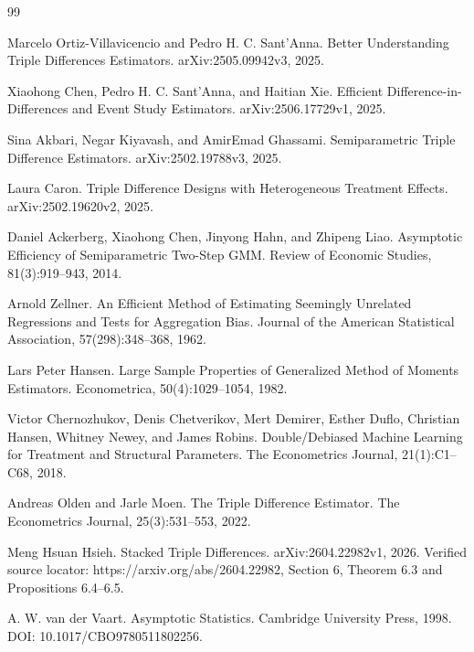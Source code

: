 \documentclass{article}
\begin{document}
\begin{thebibliography}{99}

   Marcelo Ortiz-Villavicencio and Pedro H. C. Sant'Anna. Better Understanding Triple Differences Estimators. arXiv:2505.09942v3, 2025.

   Xiaohong Chen, Pedro H. C. Sant'Anna, and Haitian Xie. Efficient Difference-in-Differences and Event Study Estimators. arXiv:2506.17729v1, 2025.

   Sina Akbari, Negar Kiyavash, and AmirEmad Ghassami. Semiparametric Triple Difference Estimators. arXiv:2502.19788v3, 2025.

   Laura Caron. Triple Difference Designs with Heterogeneous Treatment Effects. arXiv:2502.19620v2, 2025.

   Daniel Ackerberg, Xiaohong Chen, Jinyong Hahn, and Zhipeng Liao. Asymptotic Efficiency of Semiparametric Two-Step GMM. Review of Economic Studies, 81(3):919--943, 2014.

   Arnold Zellner. An Efficient Method of Estimating Seemingly Unrelated Regressions and Tests for Aggregation Bias. Journal of the American Statistical Association, 57(298):348--368, 1962.

   Lars Peter Hansen. Large Sample Properties of Generalized Method of Moments Estimators. Econometrica, 50(4):1029--1054, 1982.

   Victor Chernozhukov, Denis Chetverikov, Mert Demirer, Esther Duflo, Christian Hansen, Whitney Newey, and James Robins. Double/Debiased Machine Learning for Treatment and Structural Parameters. The Econometrics Journal, 21(1):C1--C68, 2018.

   Andreas Olden and Jarle Moen. The Triple Difference Estimator. The Econometrics Journal, 25(3):531--553, 2022.

   Meng Hsuan Hsieh. Stacked Triple Differences. arXiv:2604.22982v1, 2026. Verified source locator: https://arxiv.org/abs/2604.22982, Section 6, Theorem 6.3 and Propositions 6.4--6.5.

   A. W. van der Vaart. Asymptotic Statistics. Cambridge University Press, 1998. DOI: 10.1017/CBO9780511802256.

\end{thebibliography}
\end{document}
